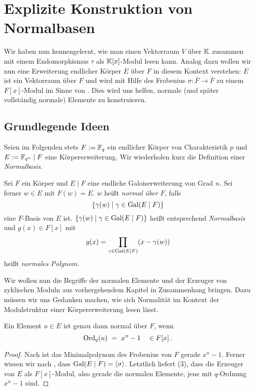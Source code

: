 \chapter{Explizite Konstruktion von Normalbasen}

Wir haben nun kennengelernt, wie man einen 
Vektorraum $V$ über $\mathbb{K}$ zusammen mit einem Endomorphismus $\tau$ als
$\mathbb{K}[x]$-Modul lesen kann. Analog dazu wollen wir nun eine Erweiterung
endlicher Körper $E$ über $F$ in diesem Kontext verstehen: $E$ ist ein
Vektorraum über $F$ und wird mit Hilfe des Frobenius 
$\sigma: \bar F \to \bar F$ zu einem $F[x]$-Modul im Sinne von 
. Dies wird uns helfen, normale (und später vollständig
normale) Elemente zu konstruieren.

\section{Grundlegende Ideen}

Seien im Folgenden stets $F := \mathbb{F}_q$ ein endlicher Körper von 
Charakteristik $p$ und $E := \mathbb{F}_{q^n} \mid F$ eine Körpererweiterung.
Wir wiederholen kurz die Definition einer \emph{Normalbasis}.

\begin{definition}
  \label{def:normal}
  Sei $F$ ein Körper und $E \mid F$ eine endliche Galoiserweiterung von Grad
  $n$. Sei ferner $w\in E$ mit $F(w) = E$. $w$ heißt \emph{normal über $F$},
  falls
  \[ \{ \gamma(w) \mid \gamma \in \operatorname{Gal}(E\mid F) \}\]
  eine $F$-Basis von $E$ ist. 
  $\{ \gamma(w) \mid \gamma \in \operatorname{Gal}(E\mid F)\}$ heißt entsprechend 
  \emph{Normalbasis} und $g(x) \in F[x]$ mit 
  \[ g(x) = \prod_{\gamma \in \operatorname{Gal}(E\mid F)}(x - \gamma(w))\]
  heißt \emph{normales Polynom}.
\end{definition}

Wir wollen nun die Begriffe der normalen Elemente und der Erzeuger von
zyklischen Moduln aus vorhergehendem Kapitel in Zusammenhang bringen. Dazu
müssen wir uns Gedanken machen, wie sich Normalität im Kontext der
Modulstruktur einer Körpererweiterung lesen lässt.

\begin{satz}
  Ein Element $u\in E$ ist genau dann normal über $F$, wenn
  \[ \operatorname{Ord}_q(u) \ =\  x^n-1 \quad\in F[x]\,.\]
\end{satz}
\begin{proof}
  Nach  ist das Minimalpolynom des Frobenius von $F$
  gerade $x^n-1$. Ferner wissen wir nach ,
  dass $\operatorname{Gal}(E\mid F) = \langle\sigma\rangle$. 
  Letztlich liefert  (3), dass die Erzeuger von 
  $E$ als $F[x]$-Modul, also gerade die normalen Elemente, jene mit $q$-Ordnung
  $x^n-1$ sind.
\end{proof}

